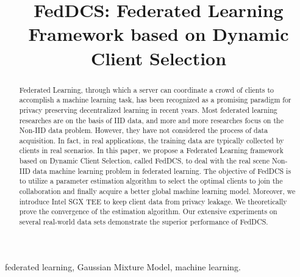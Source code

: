 \documentclass[conference]{IEEEtran}
\begin{document}
\title{FedDCS: Federated Learning Framework based on Dynamic Client Selection
}

\author{
}
\maketitle

\begin{abstract}
  Federated Learning, through which a server can coordinate a crowd of clients to accomplish a machine learning task, has been recognized as a promising paradigm for privacy preserving decentralized learning in recent years. Most federated learning researches are on the basis of IID data, and more and more researches focus on the Non-IID data problem. However, they have not considered the process of data acquisition. In fact, in real applications, the training data are typically collected by clients in real scenarios. In this paper, we propose a Federated Learning framework based on Dynamic Client Selection, called FedDCS, to deal with the real scene Non-IID data machine learning problem in federated learning. The objective of FedDCS is to utilize a parameter estimation algorithm to select the optimal clients to join the collaboration and finally acquire a better global machine learning model.
  Moreover, we introduce Intel SGX TEE to keep client data from privacy leakage. We theoretically prove the convergence of the estimation algorithm. Our extensive experiments on several real-world data sets demonstrate the superior performance of FedDCS. 
\end{abstract}

\begin{IEEEkeywords}
federated learning, Gaussian Mixture Model, machine learning.
\end{IEEEkeywords}
\end{document}
